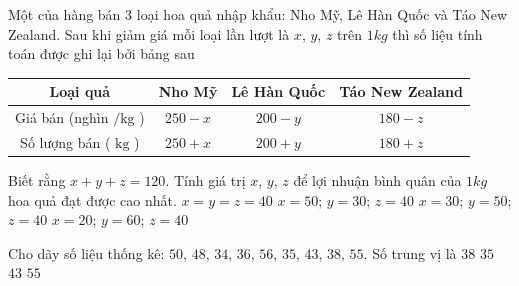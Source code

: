 \begin{ex}%
	Một của hàng bán $3$ loại hoa quả nhập khẩu: Nho Mỹ, Lê Hàn Quốc và Táo New Zealand. Sau khi giảm giá mỗi loại lần lượt là $x$, $y$, $z$ trên $1kg$ thì số liệu tính toán được ghi lại bởi bảng sau
	\begin{center}
		\begin{tabular}{|c|c|c|c|}
			\hline Loại quả & Nho Mỹ & Lê Hàn Quốc & Táo New Zealand \\
			\hline Giá bán (nghìn $/ \mathrm{kg}$ ) & $250-x$ & $200-y$ & $180-z$ \\
			\hline Số lượng bán ( $\mathrm{kg}$ ) & $250+x$ & $200+y$ & $180+z$ \\
			\hline
		\end{tabular}
	\end{center}
	Biết rằng $x+y+z=120$. Tính giá trị $x$, $y$, $z$ để lợi nhuận bình quân của $1kg$ hoa quả đạt được cao nhất.
	\choice
	{\True $x=y=z=40$}
	{$x=50$; $y=30$; $z=40$}
	{$x=30$; $y=50$; $z=40$}
	{$x=20$; $y=60$; $z=40$}
\end{ex}

\begin{ex}%
	Cho dãy số liệu thống kê:  $50$, $48$, $34$, $36$, $56$, $35$, $43$, $38$, $55$. Số trung vị là
	\choice
	{$38$}
	{$35$}
	{\True $43$}
	{$55$}
\end{ex}


